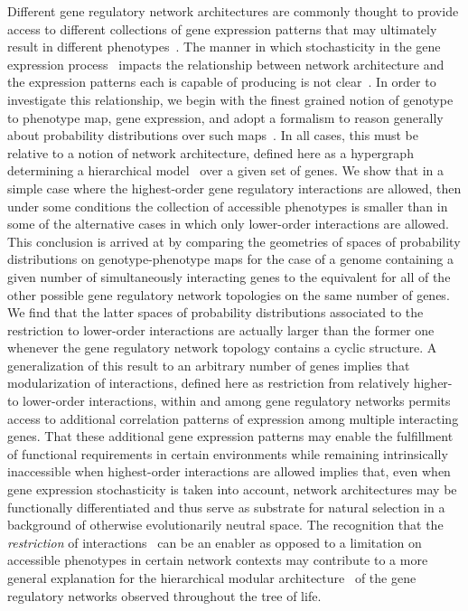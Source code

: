 Different gene regulatory network architectures are commonly thought to provide access to different collections of gene expression patterns that may ultimately result in different phenotypes~\cite{Alon2007}. The manner in which stochasticity in the gene expression process~\cite{Eldar2010,Sanchez2013} impacts the relationship between network architecture and the expression patterns each is capable of producing is not clear~\cite{Jothi2009,Chalancon2012}. In order to investigate this relationship, we begin with the finest grained notion of genotype to phenotype map, gene expression, and adopt a formalism to reason generally about probability distributions over such maps~\cite{Lane1998,MacLane1992,Awodey2006,Abramsky2011}. In all cases, this must be relative to a notion of network architecture, defined here as a hypergraph determining a hierarchical model~\cite{Lauritzen1996} over a given set of genes. We show that in a simple case where the highest-order gene regulatory interactions are allowed, then under some conditions the collection of accessible phenotypes is smaller than in some of the alternative cases in which only lower-order interactions are allowed. This conclusion is arrived at by comparing the geometries of spaces of probability distributions on genotype-phenotype maps for the case of a genome containing a given number of simultaneously interacting genes to the equivalent for all of the other possible gene regulatory network topologies on the same number of genes. We find that the latter spaces of probability distributions associated to the restriction to lower-order interactions are actually larger than the former one whenever the gene regulatory network topology contains a cyclic structure. A generalization of this result to an arbitrary number of genes implies that modularization of interactions, defined here as restriction from relatively higher- to lower-order interactions, within and among gene regulatory networks permits access to additional correlation patterns of expression among multiple interacting genes. That these additional gene expression patterns may enable the fulfillment of functional requirements in certain environments while remaining intrinsically inaccessible when highest-order interactions are allowed implies that, even when gene expression stochasticity is taken into account, network architectures may be functionally differentiated and thus serve as substrate for natural selection in a background of otherwise evolutionarily neutral space. The recognition that the \emph{restriction} of interactions~\cite{Bar-Even2006,Johnson2010a} can be an enabler as opposed to a limitation on accessible phenotypes in certain network contexts may contribute to a more general explanation for the hierarchical modular architecture~\cite{Ravasz2002,Segre2005,Wagner2007,Erwin2009,Jothi2009,Bhardwaj2010,Colm} of the gene regulatory networks observed throughout the tree of life.
